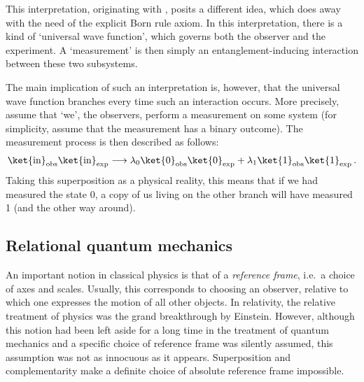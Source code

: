     This interpretation, originating with , posits a different idea, which does away with the need of the explicit Born rule axiom. In this interpretation, there is a kind of `universal wave function', which governs both the observer and the experiment. A 
    `measurement' is then simply an entanglement-inducing interaction between these two subsystems.

    The main implication of such an interpretation is, however, that the universal wave function branches every time such an interaction occurs. More precisely, assume that `we', the observers, perform a measurement on some system (for simplicity, assume that the measurement has a binary outcome). The measurement process is then described as follows:
    \begin{gather}
        \ket{\text{in}}_{\text{obs}}\ket{\text{in}}_{\text{exp}}\longrightarrow\lambda_0\ket{0}_{\text{obs}}\ket{0}_{\text{exp}}+\lambda_1\ket{1}_{\text{obs}}\ket{1}_{\text{exp}}\,.
    \end{gather}
    Taking this superposition as a physical reality, this means that if we had measured the state 0, a copy of us living on the other branch will have measured 1 (and the other way around).


\subsection{Relational quantum mechanics}

    An important notion in classical physics is that of a \textit{reference frame}, i.e.~a choice of axes and scales. Usually, this corresponds to choosing an observer, relative to which one expresses the motion of all other objects. In relativity, the relative treatment of physics was the grand breakthrough by Einstein. However, although this notion had been left aside for a long time in the treatment of quantum mechanics and a specific choice of reference frame was silently assumed, this assumption was not as innocuous as it appears. Superposition and complementarity make a definite choice of absolute reference frame impossible.

